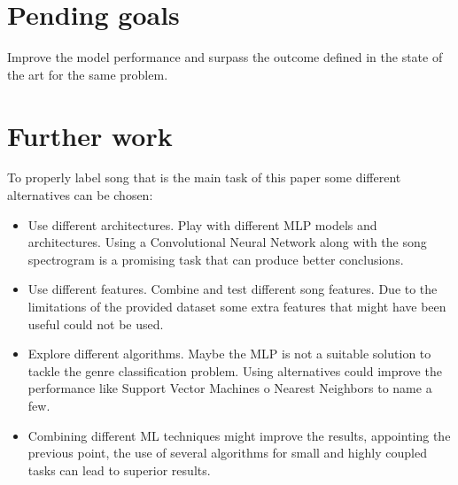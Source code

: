 \section{Pending goals}
Improve the model performance and surpass the outcome defined in the state of the art for the same problem.

\section{Further work}
To properly label song that is the main task of this paper some different alternatives can be chosen:

\begin{itemize}
	\item Use different architectures. Play with different MLP models and architectures. Using a Convolutional Neural Network along with the song spectrogram is a promising task that can produce better conclusions.
	\item Use different features. Combine and test different song features. Due to the limitations of the provided dataset some extra features that might have been useful could not be used.
	\item Explore different algorithms. Maybe the MLP is not a suitable solution to tackle the genre classification problem. Using alternatives could improve the performance like Support Vector Machines o Nearest Neighbors to name a few.
	\item Combining different ML techniques might improve the results, appointing the previous point, the use of several algorithms for small and highly coupled tasks can lead to superior results.
\end{itemize}
